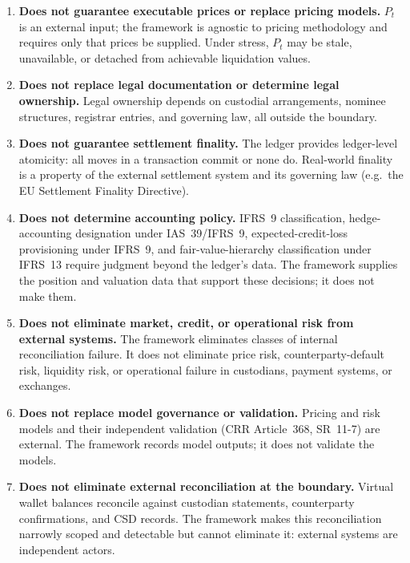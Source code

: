 \begin{enumerate}
\item \textbf{Does not guarantee executable prices or replace pricing models.} $P_t$ is an external input; the framework is agnostic to pricing methodology and requires only that prices be supplied. Under stress, $P_t$ may be stale, unavailable, or detached from achievable liquidation values.

\item \textbf{Does not replace legal documentation or determine legal ownership.} Legal ownership depends on custodial arrangements, nominee structures, registrar entries, and governing law, all outside the boundary.

\item \textbf{Does not guarantee settlement finality.} The ledger provides ledger-level atomicity: all moves in a transaction commit or none do. Real-world finality is a property of the external settlement system and its governing law (e.g.\ the EU Settlement Finality Directive).

\item \textbf{Does not determine accounting policy.} IFRS~9 classification, hedge-accounting designation under IAS~39/IFRS~9, expected-credit-loss provisioning under IFRS~9, and fair-value-hierarchy classification under IFRS~13 require judgment beyond the ledger's data. The framework supplies the position and valuation data that support these decisions; it does not make them.

\item \textbf{Does not eliminate market, credit, or operational risk from external systems.} The framework eliminates classes of internal reconciliation failure. It does not eliminate price risk, counterparty-default risk, liquidity risk, or operational failure in custodians, payment systems, or exchanges.

\item \textbf{Does not replace model governance or validation.} Pricing and risk models and their independent validation (CRR Article~368, SR~11-7) are external. The framework records model outputs; it does not validate the models.

\item \textbf{Does not eliminate external reconciliation at the boundary.} Virtual wallet balances reconcile against custodian statements, counterparty confirmations, and CSD records. The framework makes this reconciliation narrowly scoped and detectable but cannot eliminate it: external systems are independent actors.


\end{enumerate}
